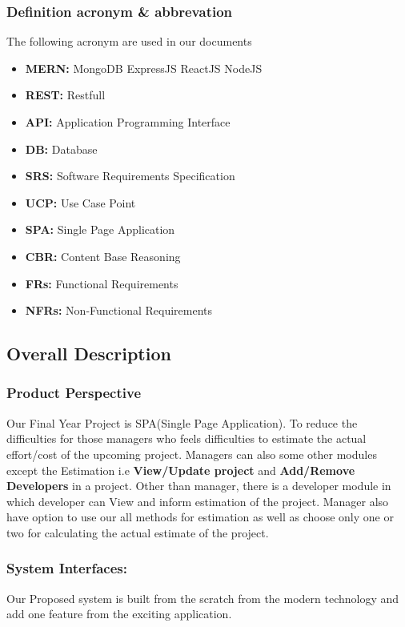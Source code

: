     \subsubsection{Definition acronym \& abbrevation}
    The following acronym are used in our documents
    \begin{center}
        \begin{itemize}
            \item {\bfseries MERN:} MongoDB ExpressJS ReactJS NodeJS
            \item {\bfseries REST:} Restfull
            \item {\bfseries API:} Application Programming Interface
            \item {\bfseries DB:} Database
            \item {\bfseries SRS:} Software Requirements Specification
            \item {\bfseries UCP:} Use Case Point
            \item {\bfseries SPA:} Single Page Application
            \item {\bfseries CBR:} Content Base Reasoning
            \item {\bfseries FRs:} Functional Requirements
            \item {\bfseries NFRs:} Non-Functional Requirements
            \end{itemize}
    \end{center}
    
\subsection{Overall Description}
\subsubsection{Product Perspective}
Our Final Year Project is SPA(Single Page Application). To reduce the difficulties for those managers who feels 
difficulties to estimate the actual effort/cost of the upcoming project. Managers can also some other modules except
the Estimation i.e {\bfseries View/Update project} and {\bfseries Add/Remove Developers} in a project. Other than manager, there is a developer module in which developer 
can View and inform estimation of the project. Manager also have option to use our all methods for estimation as well as choose only one or two for calculating the actual estimate of the project.

    \subsubsection{System Interfaces:}
    Our Proposed system is built from the scratch from the modern technology and add one feature from the exciting application. 
